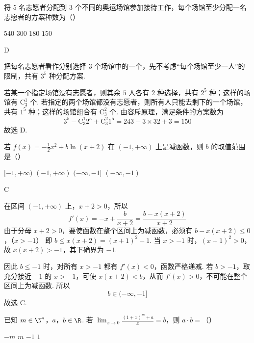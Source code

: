 \begin{problem}
将 \(5\) 名志愿者分配到 \(3\) 个不同的奥运场馆参加接待工作，每个场馆至少分配一名志愿者的方案种数为（\quad）

\choices
    {\(540\)}
    {\(300\)}
    {\(180\)}
    {\(150\)}
\end{problem}

\begin{answer}
D
\end{answer}

\begin{solution}
把每名志愿者看作分别选择 \(3\) 个场馆中的一个，先不考虑“每个场馆至少一人”的限制，共有 \(3^5\) 种分配方案.

若某一个指定场馆没有志愿者，则其余 \(5\) 人各有 \(2\) 种选择，共有 \(2^5\) 种；这样的场馆有 \(\mathrm C_3^1\) 个. 若指定的两个场馆都没有志愿者，则所有人只能去剩下的一个场馆，共有 \(1^5\) 种；这样的场馆组合有 \(\mathrm C_3^2\) 个. 由容斥原理，满足条件的方案数为
\[
3^5-\mathrm C_3^1 2^5+\mathrm C_3^2 1^5=243-3\times32+3=150
\]
故选 D.
\end{solution}

\begin{problem}
若 \( f(x) = -\frac{1}{2} x^2 + b \ln (x + 2) \) 在 \((-1, +\infty)\) 上是减函数，则 \( b \) 的取值范围是（\quad）

\choices
    {\([-1, +\infty)\)}
    {\((-1, +\infty)\)}
    {\((-\infty, -1]\)}
    {\((- \infty, -1)\)}
\end{problem}

\begin{answer}
C
\end{answer}

\begin{solution}
在区间 \((-1,+\infty)\) 上，\(x+2>0\)，所以
\[
f'(x)=-x+\frac{b}{x+2}=\frac{b-x(x+2)}{x+2}
\]
由于分母 \(x+2>0\)，要使函数在整个区间上为减函数，必须有
\(b-x(x+2)\leqslant0\)，（\(x>-1\)）
即 \(b\leqslant x(x+2)=(x+1)^2-1\). 当 \(x>-1\) 时，\((x+1)^2>0\)，故 \(x(x+2)>-1\)，其下确界为 \(-1\).

因此 \(b\leqslant-1\) 时，对所有 \(x>-1\) 都有 \(f'(x)<0\)，函数严格递减. 若 \(b>-1\)，取充分接近 \(-1\) 的 \(x>-1\)，可使 \(x(x+2)<b\)，从而 \(f'(x)>0\)，不可能在整个区间上为减函数. 所以
\[
b\in(-\infty,-1]
\]
故选 C.
\end{solution}

\begin{problem}
已知 \(m \in \N^*\)，\(a\)，\(b \in \R\). 若 \(\displaystyle\lim_{x \to 0} \frac{(1 + x)^m + a}{x} = b\)，则 \(a \cdot b =\)（\quad）

\choices
    {\(-m\)}
    {\(m\)}
    {\(-1\)}
    {\(1\)}
\end{problem}

